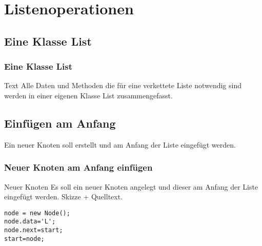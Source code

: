\section{Listenoperationen}

\begin{multicols}{2}

\subsection{Eine Klasse List}

\begin{frame}[fragile]
\frametitle<presentation>{Eine Klasse List}
\begin{assignment}{3cm}{Text}
Alle Daten und Methoden die für eine verkettete Liste notwendig sind werden in einer eigenen Klasse List zusammengefasst.
\end{assignment}

\end{frame}



\subsection{Einfügen am Anfang}

Ein neuer Knoten soll erstellt und am Anfang der Liste eingefügt werden.
\begin{frame}[fragile]
\frametitle<presentation>{Neuer Knoten am Anfang einfügen}

\begin{assignment}{3cm}{Neuer Knoten}
Es soll ein neuer Knoten angelegt und dieser am Anfang der Liste eingefügt werden.
Skizze + Quelltext.
\end{assignment}
\pause
\begin{vers:beamersolutions}\begin{Loesung}
\pause%
\begin{lstlisting}[emph={}]
node = new Node();
node.data='L';
node.next=start;
start=node;
\end{lstlisting}
\end{Loesung}\end{vers:beamersolutions}



\end{frame}
\end{multicols}
